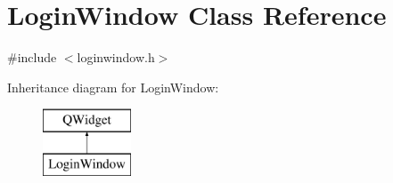 \hypertarget{class_login_window}{}\section{Login\+Window Class Reference}
\label{class_login_window}


{\ttfamily \#include $<$loginwindow.\+h$>$}

Inheritance diagram for Login\+Window\+:\begin{figure}[H]
\begin{center}
\leavevmode
\includegraphics[height=2.000000cm]{class_login_window}
\end{center}
\end{figure}
